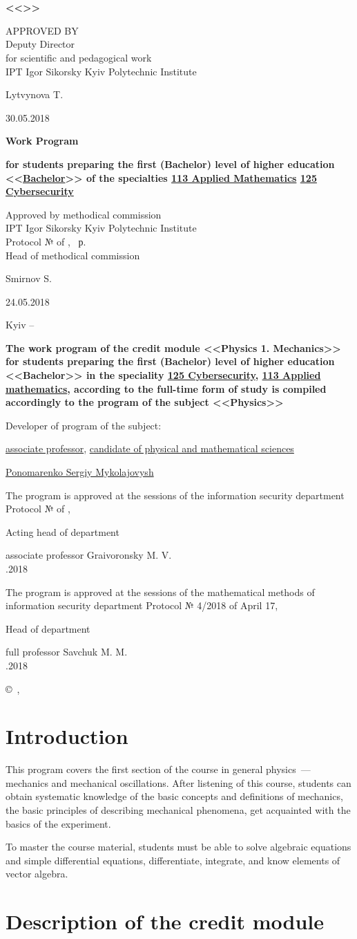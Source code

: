 \documentclass{rnp}
\def\rnptitlepage{%
	\thispagestyle{empty}	
	\begin{center}
		\MakeUppercase{\bfseries\Ministry}\\
		\MakeUppercase{\bfseries\ntuu}\\
		\MakeUppercase{\bfseries<<\kpi>>}\\
	\end{center}
	
	\hfill\begin{minipage}{0.7\linewidth}
		APPROVED BY\\
		Deputy Director\\
		for scientific and pedagogical work\\
		IPT Igor Sikorsky Kyiv Polytechnic Institute
		
		\hfill Lytvynova T. \hspace{4em}
		
		\hfill 30.05.2018\hspace{4em}
	\end{minipage}
	
	\vfill
	\begin{center}
		\noindent\large\bfseries\discipline
	\end{center}	
	\vfill
	\begin{center}\bfseries
		Work Program
	\end{center}
	
	\begin{center}	\bfseries
		for students preparing the first (Bachelor) level of higher education <<\underline{Bachelor}>> of the specialties \underline{113 Applied Mathematics}
		\hspace*{20ex}\underline{125 Cybersecurity}
	\end{center}
	
	\vfill
	
	\hfill\begin{minipage}{0.7\linewidth}
		Approved by methodical commission\\
		IPT Igor Sikorsky Kyiv Polytechnic Institute\\
		Protocol  № \methodcomnum{} of \methodcommonth{} \methodcomday, \the\year~р. \\
		Head of methodical commission
		
		\hspace*{21ex} Smirnov S.
		
		\hspace*{21ex} 24.05.2018 
	\end{minipage}
	
	\vfill
	
	\begin{center}
		Kyiv -- \the\year
	\end{center}
	\newpage
	\thispagestyle{empty}
	
	{\noindent\bfseries The work program of the credit module <<Physics 1. Mechanics>> for
		students preparing the first (Bachelor) level of higher education <<Bachelor>> in the speciality \underline{125 Cybersecurity}, \underline{113 Applied mathematics}, according to the full-time form of study is compiled accordingly to the program of the subject <<Physics>>}
	
	\vspace*{2em}
	\noindent Developer of program of the subject:
	
	\noindent \underline{associate professor}, \underline{candidate of physical and mathematical sciences}
	
	\noindent\underline{Ponomarenko Sergiy Mykolajovysh}
	
	
	\vfill
	\noindent The program is approved at the sessions of the information security department Protocol № \kafnum{} of \kafmonth{} \kafday{}, \the\year 
	
	\noindent Acting head of department
	
	
	\noindent \hspace*{5cm} associate professor Graivoronsky M. V.\\
	
	\noindent 25.04.2018
	
	\vfill
	
	\noindent The program is approved at the sessions of the mathematical methods of information security department Protocol № 4/2018 of April 17, \the\year 
	
	\noindent Head of department
	
	
	\noindent \hspace*{5cm} full professor Savchuk M. M. \\
	
	\noindent 17.04.2018
	
	\vfill
	\begin{flushright}\small
		\copyright~\kpi, \the\year
	\end{flushright}
	\newpage
}
\begin{document}
\rnptitlepage

%
\section*{Introduction}
%


This program covers the first section of the course in general physics~--- mechanics and mechanical oscillations. After listening of this course, students can obtain systematic knowledge of the basic concepts and definitions of mechanics, the basic principles of describing mechanical phenomena, get acquainted with the basics of the experiment.

To master the course material, students must be able to solve algebraic equations and simple differential equations, differentiate, integrate, and know elements of vector algebra.

%
\section{Description of the credit module}
%
\end{document}
